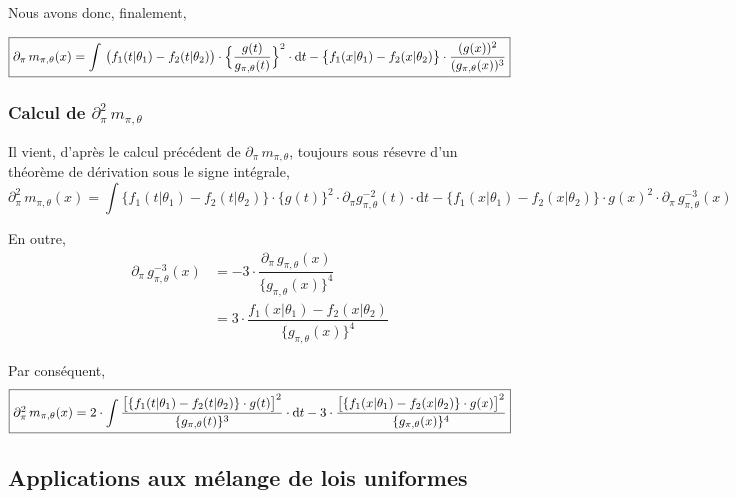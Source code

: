 \documentclass{article}
\begin{document}
    Nous avons donc, finalement,

    $$\fbox{$\partial_\pi\,m_{\pi,\theta}(x) = \mathop{\mathlarger{\int}}\, \big(f_1(t|\theta_1)-f_2(t|\theta_2)\big)\cdot\Big\{\dfrac{g(t)}{g_{\pi,\theta}(t)}\Big\}^2\cdot\mathrm{d}t - \big\{f_1(x|\theta_1)-f_2(x|\theta_2)\big\}\cdot\dfrac{(g(x))^2}{(g_{\pi,\theta}(x))^3}$} $$

    \subsubsection*{Calcul de $\partial^2_\pi\,m_{\pi,\theta}$}


 
    Il vient, d'après le calcul précédent de $\partial_\pi\,m_{\pi,\theta}$, {\color{red} toujours sous résevre d'un théorème de dérivation sous le signe intégrale},
    $$\partial^2_\pi\,m_{\pi,\theta}(x) = \int\{f_1(t|\theta_1) - f_2(t|\theta_2)\}\cdot\{g(t)\}^2\cdot\partial_\pi{}g^{-2}_{\pi,\theta}(t)\cdot\mathrm{d}t - \{f_1(x|\theta_1) - f_2(x|\theta_2)\}\cdot{g(x)}^2\cdot\partial_\pi\,g^{-3}_{\pi,\theta}(x) $$ 

    En outre,
    \begin{align*}
        \partial_\pi\, g^{-3}_{\pi,\theta}(x) & = -3\cdot\dfrac{\partial_\pi\,g_{\pi,\theta}(x)}{\{g_{\pi,\theta}(x)\}^4} \\
        & = 3\cdot\dfrac{f_1(x|\theta_1)-f_2(x|\theta_2)}{\{g_{\pi,\theta}(x)\}^4}
    \end{align*}

    Par conséquent,
    $$ \fbox{$\partial^2_\pi\,m_{\pi,\theta}(x) = 2\cdot\mathop{\mathlarger{\int}}\dfrac{\big[\{f_1(t|\theta_1)-f_2(t|\theta_2)\}\cdot{}g(t)\big]^2}{\{g_{\pi,\theta}(t)\}^3}\cdot\mathrm{d}t - 3\cdot\dfrac{\big[\{f_1(x|\theta_1)-f_2(x|\theta_2)\}\cdot{}g(x)\big]^2}{\{g_{\pi,\theta}(x)\}^4}$} $$


    \subsection{Applications aux mélange de lois uniformes}
\end{document}
